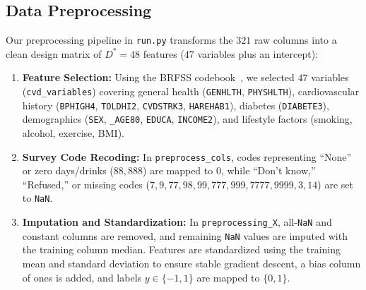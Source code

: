 \documentclass[10pt,conference,compsocconf]{IEEEtran}
\begin{document}
\subsection{Data Preprocessing}
Our preprocessing pipeline in \texttt{run.py} transforms the $321$ raw columns into a clean design matrix of $D^* = 48$ features ($47$ variables plus an intercept):
\begin{enumerate}
    \item \textbf{Feature Selection:} Using the BRFSS codebook~\cite{noauthor_www2statdukeeducr173sta102_sp16projcodebookhtml_nodate,cdc_brfss_codebook_2015}, we selected $47$ variables (\texttt{cvd\_variables}) covering general health (\texttt{GENHLTH}, \texttt{PHYSHLTH}), cardiovascular history (\texttt{BPHIGH4}, \texttt{TOLDHI2}, \texttt{CVDSTRK3}, \texttt{HAREHAB1}), diabetes (\texttt{DIABETE3}), demographics (\texttt{SEX}, \texttt{\_AGE80}, \texttt{EDUCA}, \texttt{INCOME2}), and lifestyle factors (smoking, alcohol, exercise, BMI).
    \item \textbf{Survey Code Recoding:} In \texttt{preprocess\_cols}, codes representing ``None'' or zero days/drinks ($88, 888$) are mapped to $0$, while ``Don't know,'' ``Refused,'' or missing codes ($7, 9, 77, 98, 99, 777, 999, 7777, 9999, 3, 14$) are set to \texttt{NaN}.
    \item \textbf{Imputation and Standardization:} In \texttt{preprocessing\_X}, all-\texttt{NaN} and constant columns are removed, and remaining \texttt{NaN} values are imputed with the training column median. Features are standardized using the training mean and standard deviation to ensure stable gradient descent, a bias column of ones is added, and labels $y \in \{-1, 1\}$ are mapped to $\{0, 1\}$.
\end{enumerate}
\end{document}
